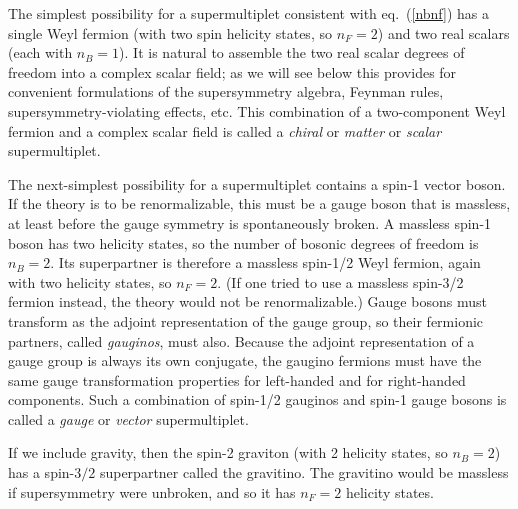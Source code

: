\documentclass[12pt]{article}
\begin{document}
The simplest possibility for a supermultiplet consistent with
eq.~(\ref{nbnf}) has a single Weyl fermion (with two spin helicity states,
so $n_F=2$) and two real scalars (each with $n_B=1$). It is natural to
assemble the two real scalar degrees of freedom into a complex scalar
field; as we will see below this provides for convenient formulations of
the supersymmetry algebra, Feynman rules, supersymmetry-violating effects,
etc. This combination of a two-component Weyl fermion and a complex scalar
field is called a {\it chiral} or {\it matter} or {\it scalar}
supermultiplet. 

The next-simplest possibility for a supermultiplet contains a spin-1
vector boson. If the theory is to be renormalizable, this must be a gauge
boson that is massless, at least before the gauge symmetry is
spontaneously broken. A massless spin-1 boson has two helicity states, so
the number of bosonic degrees of freedom is $n_B=2$. Its superpartner is
therefore a massless spin-1/2 Weyl fermion, again with two helicity
states, so $n_F=2$. (If one tried to use a massless spin-3/2 fermion
instead, the theory would not be renormalizable.) Gauge bosons must
transform as the adjoint representation of the gauge group, so their
fermionic partners, called {\it gauginos}, must also. Because the adjoint
representation of a gauge group is always its own conjugate, the gaugino
fermions must have the same gauge transformation properties for
left-handed and for right-handed components. Such a combination of
spin-1/2 gauginos and spin-1 gauge bosons is called a {\it gauge} or {\it
vector} supermultiplet. 

If we include gravity, then the spin-2 graviton (with 2 helicity states,
so $n_B=2$) has a spin-$3/2$ superpartner called the gravitino. The
gravitino would be massless if supersymmetry were unbroken, and so it has
$n_F=2$ helicity states. 
\end{document}
